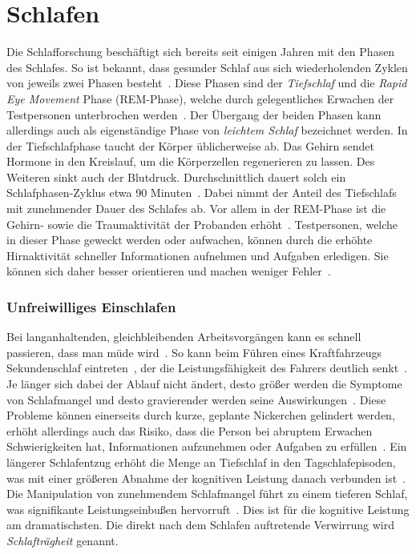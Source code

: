 \section{Schlafen}\label{sec:relatedWork.schlafen}

Die Schlafforschung beschäftigt sich bereits seit einigen Jahren mit den Phasen des Schlafes. So ist bekannt, dass gesunder Schlaf aus sich wiederholenden Zyklen von jeweils zwei Phasen besteht~\cite{broughton1968sleep}.
Diese Phasen sind der \textit{Tiefschlaf} und die \textit{Rapid Eye Movement} Phase (REM-Phase), welche durch gelegentliches Erwachen der Testpersonen unterbrochen werden~\cite{broughton1968sleep}. Der Übergang der beiden Phasen kann allerdings auch als eigenständige Phase von \textit{leichtem Schlaf} bezeichnet werden. 
In der Tiefschlafphase taucht der Körper üblicherweise ab. Das Gehirn sendet Hormone in den Kreislauf, um die Körperzellen regenerieren zu lassen. Des Weiteren sinkt auch der Blutdruck.
Durchschnittlich dauert solch ein Schlafphasen-Zyklus etwa 90 Minuten~\cite{broughton1968sleep}. Dabei nimmt der Anteil des Tiefschlafs mit zunehmender Dauer des Schlafes ab.
Vor allem in der REM-Phase ist die Gehirn- sowie die Traumaktivität der Probanden erhöht~\cite{gackenbach1991herrscher, broughton1968sleep}. Testpersonen, welche in dieser Phase geweckt werden oder aufwachen, können durch die erhöhte Hirnaktivität schneller Informationen aufnehmen und Aufgaben erledigen. Sie können sich daher besser orientieren und machen weniger Fehler~\cite{aschoff1985perception}. 

\subsubsection{Unfreiwilliges Einschlafen}

Bei langanhaltenden, gleichbleibenden Arbeitsvorgängen kann es schnell passieren, dass man müde wird~\cite{dinges1985assessing,kraemer2000time}. So kann beim Führen eines Kraftfahrzeugs Sekundenschlaf eintreten~\cite{ruhle2008sekundenschlaf, muttray2010videoanalyse,mccartt2000factors}, der die Leistungsfähigkeit des Fahrers deutlich senkt~\cite{boyle2008driver}. Je länger sich dabei der Ablauf nicht ändert, desto größer werden die Symptome von Schlafmangel und desto gravierender werden seine Auswirkungen~\cite{boyle2008driver,mccartt2000factors}.
Diese Probleme können einerseits durch kurze, geplante Nickerchen gelindert werden, erhöht allerdings auch das Risiko, dass die Person bei abruptem Erwachen Schwierigkeiten hat, Informationen aufzunehmen oder Aufgaben zu erfüllen~\cite{dinges1985assessing}. 
Ein längerer Schlafentzug erhöht die Menge an Tiefschlaf in den Tagschlafepisoden, was mit einer größeren Abnahme der kognitiven Leistung danach verbunden ist~\cite{dinges1985assessing}. Die Manipulation von zunehmendem Schlafmangel führt zu einem tieferen Schlaf, was signifikante Leistungseinbußen hervorruft~\cite{dinges1985assessing}. Dies ist für die kognitive Leistung am dramatischsten. Die direkt nach dem Schlafen auftretende Verwirrung wird \textit{Schlafträgheit} genannt.

